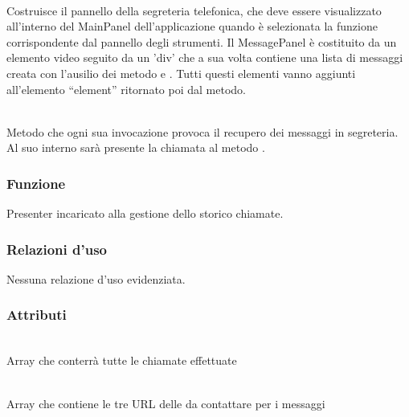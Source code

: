 \begin{description}
\item{}\\
Costruisce il pannello della segreteria telefonica, che deve essere visualizzato all'interno del MainPanel dell'applicazione quando è selezionata la funzione corrispondente dal pannello degli strumenti. Il MessagePanel è costituito da un elemento video seguito da un 'div' che a sua volta contiene una lista di messaggi creata con l'ausilio dei metodo  e . Tutti questi elementi vanno aggiunti all'elemento ``element'' ritornato poi dal metodo.

\item{}\\
Metodo che ogni sua invocazione provoca il recupero dei messaggi in segreteria. Al suo interno sarà presente la chiamata al metodo .

\end{description}



\subsubsection*{Funzione}
Presenter incaricato alla gestione dello storico chiamate.

\subsubsection*{Relazioni d'uso}
Nessuna relazione d'uso evidenziata.

\subsubsection*{Attributi}
\begin{description}
\item{}\\
Array che conterrà tutte le chiamate effettuate
\item{}\\
Array che contiene le tre URL delle  da contattare per i messaggi
\end{description}

